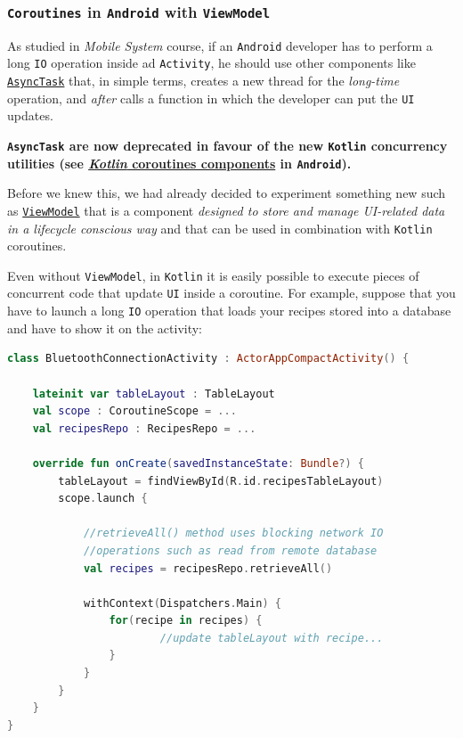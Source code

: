 \subsubsection{\texttt{Coroutines} in \texttt{Android} with \texttt{ViewModel}}

As studied in \textit{Mobile System} course, if an \texttt{Android} developer has to perform a long \texttt{IO} operation inside ad \texttt{Activity}, he should use other components like \href{https://developer.android.com/reference/android/os/AsyncTask}{\texttt{AsyncTask}} that, in simple terms, creates a new thread for the \textit{long-time} operation, and \textit{after} calls a function in which the developer can put the \texttt{UI} updates.

\begin{tcolorbox}[colback=red!5!white,colframe=red!75!black]
	\begin{center}
		\textbf{\texttt{AsyncTask} are now deprecated in favour of the new \texttt{Kotlin} concurrency utilities (see \href{https://developer.android.com/topic/libraries/architecture/coroutines}{\textit{Kotlin} coroutines components} in \texttt{Android}).}
	\end{center}
\end{tcolorbox}

Before we knew this, we had already decided to experiment something new such as \href{https://developer.android.com/topic/libraries/architecture/viewmodel}{\texttt{ViewModel}} that is a component \textit{designed to store and manage UI-related data in a lifecycle conscious way} and that can be used in combination with \texttt{Kotlin} coroutines.

Even without \texttt{ViewModel}, in \texttt{Kotlin} it is easily possible to execute pieces of concurrent code that update \texttt{UI} inside a coroutine. For example, suppose that you have to launch a long \texttt{IO} operation that loads your recipes stored into a database and have to show it on the activity:

\begin{lstlisting}[language=Kotlin]
class BluetoothConnectionActivity : ActorAppCompactActivity() {
	
	lateinit var tableLayout : TableLayout
	val scope : CoroutineScope = ...
	val recipesRepo : RecipesRepo = ...
	
	override fun onCreate(savedInstanceState: Bundle?) {
		tableLayout = findViewById(R.id.recipesTableLayout)
		scope.launch {
			
			//retrieveAll() method uses blocking network IO
			//operations such as read from remote database
			val recipes = recipesRepo.retrieveAll()
			
			withContext(Dispatchers.Main) {
				for(recipe in recipes) {
						//update tableLayout with recipe...
				}
			}
		}
	}
}
\end{lstlisting}

